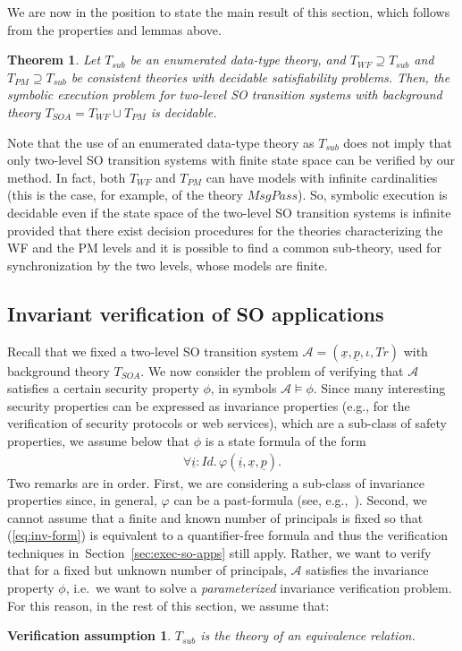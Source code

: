 \documentclass[conference]{IEEEtran}
\newtheorem{theorem}{Theorem}
\newtheorem{verification-assumption}{Verification assumption}
\newcommand{\close}{\IEEEQEDclosed}
\newcommand{\secref}[1]{Section~\ref{#1}}
\begin{document}
We are now in the position to state the main result of this section, which follows from the properties and lemmas above.
\begin{theorem}
  Let $T_\mathit{sub}$ be an enumerated data-type theory, and $T_\mathit{WF} \supseteq
  T_\mathit{sub}$ and $T_\mathit{PM} \supseteq T_\mathit{sub}$ be consistent theories with
  decidable satisfiability problems.  Then, the symbolic execution
  problem for two-level SO transition systems with background theory
  $T_\mathit{SOA}=T_\mathit{WF}\cup T_\mathit{PM}$ is decidable. \hfill \close
\end{theorem}

Note that the use of an enumerated data-type theory as $T_\mathit{sub}$
does not imply that only two-level SO transition systems with finite state space can
be verified by our method.  In fact, both $T_\mathit{WF}$ and $T_\mathit{PM}$ can
have models with infinite cardinalities (this is the case, for
example, of the theory $\mathit{MsgPass}$).  So, symbolic execution is
decidable even if the state space of the two-level SO transition systems is infinite
provided that there exist decision procedures for the theories
characterizing the WF and the PM levels and it is possible to
find a common sub-theory, used for synchronization by the two levels,
whose models are finite.  

\subsection{Invariant verification of SO applications}
\label{sec:inv-so-apps}

Recall that we fixed a two-level SO transition system
$\mathcal{A}=(\underline{x},\underline{p},\iota,Tr)$ with background
theory $T_\mathit{SOA}$.  We now consider the problem of verifying that 
$\mathcal{A}$ satisfies a certain security property
$\phi$, in symbols $\mathcal{A} \models \phi$.  Since many interesting
security properties can be expressed as invariance properties (e.g., for the verification of security protocols or web services), which are a sub-class of safety properties, we assume
below that $\phi$ is a state formula of the form
\begin{eqnarray}
  \label{eq:inv-form}
  \forall \underline{i}:\mathit{Id}.\, \varphi(\underline{i},\underline{x},\underline{p}) .
\end{eqnarray}
Two remarks are in order.  First, we are considering a sub-class of
invariance properties since, in general, $\varphi$ can be a
past-formula (see, e.g.,~\cite{manna-pnueli-book}).  Second, we cannot
assume that a finite and known number of principals is fixed so that
(\ref{eq:inv-form}) is equivalent to a quantifier-free formula and thus
the verification techniques in~\secref{sec:exec-so-apps} still apply.
Rather, we want to verify that for a fixed but unknown number of
principals, $\mathcal{A}$ satisfies the invariance
property $\phi$, i.e.\ we want to solve a \emph{parameterized}
invariance verification problem.  For this reason, in the rest of this
section, we assume that:
\begin{verification-assumption}
$T_\mathit{sub}$ is the theory of an equivalence relation. \hfill \close
\end{verification-assumption}
\end{document}
